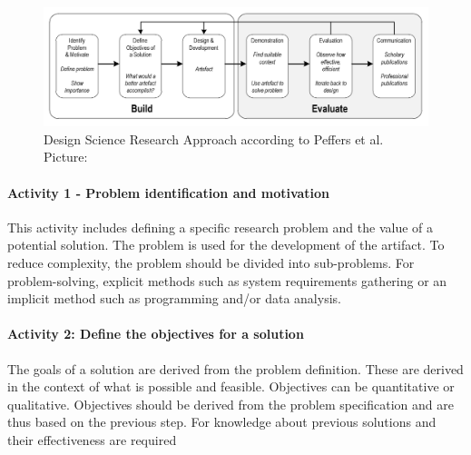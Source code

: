 \begin{figure}[H]
    \begin{tcolorbox}[arc=0pt,boxrule=0.5pt]
        \centering
        \includegraphics[width=1\linewidth]{chap3/images/dsr_process.png}
        \caption[DSR Process]{Design Science Research Approach according to Peffers et al.
        Picture: \cite[p. 72]{sonnenberg_evaluationpatternsdesign_2012}}
        \label{fig:dsr_process}
    \end{tcolorbox}
\end{figure}



\paragraph{Activity 1 - Problem identification and motivation}
This activity includes defining a specific research problem and the value of a potential solution.
The problem is used for the development of the artifact. To reduce complexity, the problem should
be divided into sub-problems. For problem-solving, explicit methods such as system requirements
gathering or an implicit method such as programming and/or data analysis.
\cite[p. 52]{peffers_designscienceresearch_2007}

\paragraph{Activity 2: Define the objectives for a solution}
The goals of a solution are derived from the problem definition. These are derived in the context
of what is possible and feasible.
Objectives can be quantitative or qualitative. Objectives should be derived from the
problem specification and are thus based on the previous step.
For knowledge about previous solutions and their effectiveness are required
\cite[p. 55]{peffers_designscienceresearch_2007}

